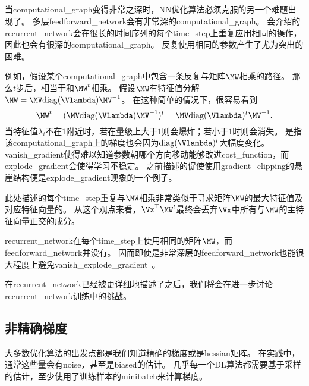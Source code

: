 \subsection{}
\label{sec:long_term_dependencies}
当\gls{computational_graph}变得非常之深时，\gls{NN}优化算法必须克服的另一个难题出现了。
多层\gls{feedforward_network}会有非常深的\gls{computational_graph}。
会介绍的\gls{recurrent_network}会在很长的时间序列的每个\gls{time_step}上重复应用相同的操作，因此也会有很深的\gls{computational_graph}。
反复使用相同的参数产生了尤为突出的困难。


例如，假设某个\gls{computational_graph}中包含一条反复与矩阵$\MW$相乘的路径。
那么$t$步后，相当于和$\MW^t$相乘。
假设$\MW$有特征值分解$\MW = \MV \text{diag}(\Vlambda) \MV^{-1}$。
在这种简单的情况下，很容易看到
\begin{equation}
  \MW^t = (\MV \text{diag}(\Vlambda) \MV^{-1})^t = \MV\text{diag}(\Vlambda)^t  \MV^{-1}.
\end{equation}
当特征值$\lambda_i$不在$1$附近时，若在量级上大于$1$则会爆炸；若小于$1$时则会消失。
是指该\gls{computational_graph}上的梯度也会因为$\text{diag}(\Vlambda)^t$大幅度变化。
\gls{vanish_gradient}使得难以知道参数朝哪个方向移动能够改进\gls{cost_function}，而\gls{explode_gradient}会使得学习不稳定。
之前描述的促使使用\gls{gradient_clipping}的悬崖结构便是\gls{explode_gradient}现象的一个例子。


此处描述的每个\gls{time_step}重复与$\MW$相乘非常类似于寻求矩阵$\MW$的最大特征值及对应特征向量的。
从这个观点来看，$\Vx^\top\MW^t$最终会丢弃$\Vx$中所有与$\MW$的主特征向量正交的成分。


\gls{recurrent_network}在每个\gls{time_step}上使用相同的矩阵$\MW$，而\gls{feedforward_network}并没有。
因而即使是非常深层的\gls{feedforward_network}也能很大程度上避免\gls{vanish_explode_gradient}~\citep{Sussillo14}。


在\gls{recurrent_network}已经被更详细地描述了之后，我们将会在进一步讨论\gls{recurrent_network}训练中的挑战。

\subsection{非精确梯度}
\label{sec:inexact_gradients}
大多数优化算法的出发点都是我们知道精确的梯度或是\gls{hessian}矩阵。
在实践中，通常这些量会有\gls{noise}，甚至是\gls{biased}的估计。
几乎每一个\gls{DL}算法都需要基于采样的估计，至少使用了训练样本的\gls{minibatch}来计算梯度。


